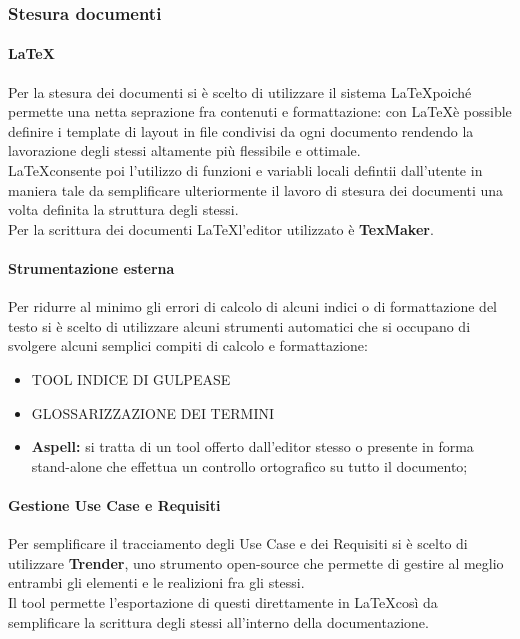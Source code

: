     \subsubsection{Stesura documenti}
      \paragraph{\LaTeX}
        Per la stesura dei documenti si è scelto di utilizzare il sistema \LaTeX poiché permette una netta seprazione fra contenuti
        e formattazione: con \LaTeX è possible definire i template di layout in file condivisi da ogni documento rendendo la lavorazione
        degli stessi altamente più flessibile e ottimale.\\
        \LaTeX consente poi l'utilizzo di funzioni e variabli locali defintii dall'utente in maniera tale da semplificare ulteriormente
        il lavoro di stesura dei documenti una volta definita la struttura degli stessi.\\
        Per la scrittura dei documenti \LaTeX l'editor utilizzato è \textbf{TexMaker}.
      \paragraph{Strumentazione esterna}
        Per ridurre al minimo gli errori di calcolo di alcuni indici o di formattazione del testo si è scelto di utilizzare alcuni strumenti
        automatici che si occupano di svolgere alcuni semplici compiti di calcolo e formattazione:
        \begin{itemize}
          \item \large{TOOL INDICE DI GULPEASE}
          \item \large{GLOSSARIZZAZIONE DEI TERMINI}
          \item \textbf{Aspell: }si tratta di un tool offerto dall'editor stesso o presente in forma stand-alone che effettua un controllo ortografico
          su tutto il documento;
        \end{itemize}
      \paragraph{Gestione Use Case e Requisiti}
        Per semplificare il tracciamento degli Use Case e dei Requisiti si è scelto di utilizzare \textbf{Trender}, uno strumento open-source che permette
        di gestire al meglio entrambi gli elementi e le realizioni fra gli stessi.\\
        Il tool permette l'esportazione di questi direttamente in \LaTeX così da semplificare la scrittura degli stessi all'interno della documentazione.
